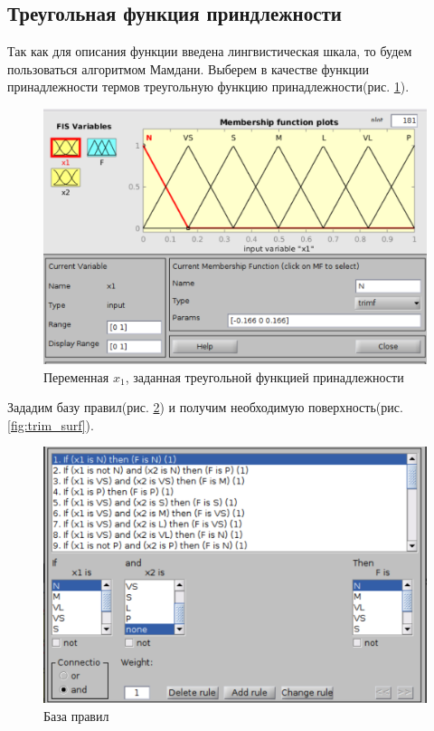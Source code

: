 \documentclass[11pt,a4paper]{report}
\newcommand{\insref}[1]{рис. \ref{#1}}
\begin{document}
	\subsection{Треугольная функция приндлежности}
	Так как для описания функции введена лингвистическая шкала, то будем пользоваться алгоритмом Мамдани. Выберем в качестве функции принадлежности термов треугольную функцию принадлежности(\insref{fig:trimf}).
	\begin{figure}[!hbtp]
		\centering
		\includegraphics[width=\linewidth]{trimf.png}
		\caption{Переменная $x_1$, заданная треугольной функцией принадлежности}
		\label{fig:trimf}
	\end{figure}
	\newline
	Зададим базу правил(\insref{fig:rules}) и получим необходимую поверхность(\insref{fig:trim_surf}).
	\begin{figure}[!hbtp]
		\centering
		\includegraphics[width=\linewidth]{rules.png}
		\caption{База правил}
		\label{fig:rules}
	\end{figure}
\end{document}
